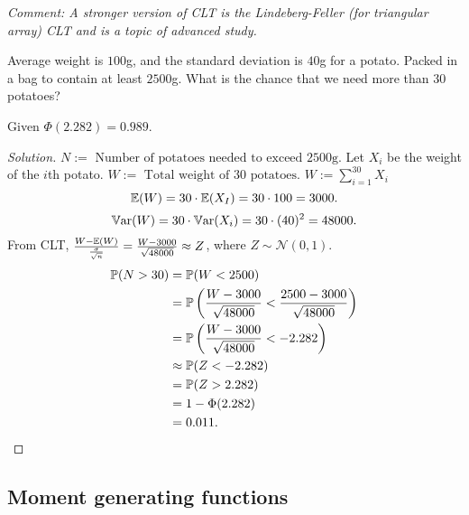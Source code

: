 \documentclass[10pt, a4paper]{article}
\begin{document}
\textit{Comment:
A stronger version of CLT is the Lindeberg-Feller
(for triangular array)
CLT and is a topic of advanced study.}

\begin{example}
    Average weight is $100$g,
    and the standard deviation is $40$g for a potato.
    Packed in a bag to contain at least $2500$g.
    What is the chance that we need more than $30$ potatoes?

    Given $\Phi(2.282) = 0.989$.

    \begin{proof}[Solution]\renewcommand{\qedsymbol}{}
        $N := \text{ Number of potatoes needed to exceed $2500$g}$.
        Let $X_i$ be the weight of the $i$th potato.
        $W := \text{ Total weight of $30$ potatoes}$.
        $W := \sum_{i = 1}^{30}X_i$
        \[
        \E(W) = 30 \cdot \E(X_I) = 30 \cdot 100 = 3000.
        \]
        \[
        \Var(W) = 30 \cdot \Var(X_i) = 30 \cdot (40) ^ 2 = 48000.
        \]
        From CLT,
        $\frac{W - \E(W)}{\frac{\sigma}{\sqrt{n}}} = \frac{W - 3000}{\sqrt{48000}} \approx Z$,
        where $Z \sim \mathcal{N}(0, 1)$.
        \begin{align*}
            \P(N > 30) &= \P(W < 2500) \\
            &= \P\left(\frac{W - 3000}{\sqrt{48000}} < \frac{2500 - 3000}{\sqrt{48000}}\right) \\
            &= \P\left(\frac{W - 3000}{\sqrt{48000}} < -2.282\right) \\
            &\approx \P(Z < -2.282) \\
            &= \P(Z > 2.282) \\
            &= 1 - \Phi(2.282) \\
            &= 0.011.
        \end{align*}
    \end{proof}
\end{example}

\subsection{Moment generating functions}
\end{document}
